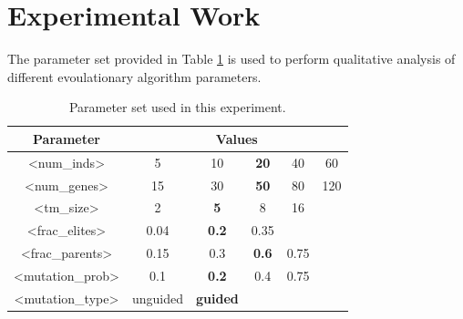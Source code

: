 \documentclass{assignment}
\date{\today}
\begin{document}
\section{Experimental Work}
The parameter set provided in Table \ref{tab:parameter_sweep} is used to perform qualitative analysis of different evoulationary algorithm parameters.

\begin{table}[htbp!]
    \centering
    \caption{Parameter set used in this experiment.}
    \label{tab:parameter_sweep}
    \begin{tabular}{|c|ccccc|}
    \hline
    \textbf{Parameter}                      & \multicolumn{5}{c|}{\textbf{Values}}                                                                                                       \\ \hline
    \textless{}num\_inds\textgreater{}      & \multicolumn{1}{c|}{5}        & \multicolumn{1}{c|}{10}              & \multicolumn{1}{c|}{\textbf{20}}  & \multicolumn{1}{c|}{40}   & 60  \\ \hline
    \textless{}num\_genes\textgreater{}     & \multicolumn{1}{c|}{15}       & \multicolumn{1}{c|}{30}              & \multicolumn{1}{c|}{\textbf{50}}  & \multicolumn{1}{c|}{80}   & 120 \\ \hline
    \textless{}tm\_size\textgreater{}       & \multicolumn{1}{c|}{2}        & \multicolumn{1}{c|}{\textbf{5}}      & \multicolumn{1}{c|}{8}            & \multicolumn{1}{c|}{16}   &     \\ \hline
    \textless{}frac\_elites\textgreater{}   & \multicolumn{1}{c|}{0.04}     & \multicolumn{1}{c|}{\textbf{0.2}}    & \multicolumn{1}{c|}{0.35}         & \multicolumn{1}{c|}{}     &     \\ \hline
    \textless{}frac\_parents\textgreater{}  & \multicolumn{1}{c|}{0.15}     & \multicolumn{1}{c|}{0.3}             & \multicolumn{1}{c|}{\textbf{0.6}} & \multicolumn{1}{c|}{0.75} &     \\ \hline
    \textless{}mutation\_prob\textgreater{} & \multicolumn{1}{c|}{0.1}      & \multicolumn{1}{c|}{\textbf{0.2}}    & \multicolumn{1}{c|}{0.4}          & \multicolumn{1}{c|}{0.75} &     \\ \hline
    \textless{}mutation\_type\textgreater{} & \multicolumn{1}{c|}{unguided} & \multicolumn{1}{c|}{\textbf{guided}} & \multicolumn{1}{c|}{}             & \multicolumn{1}{c|}{}     &     \\ \hline
\end{tabular}
\end{table}
\end{document}
